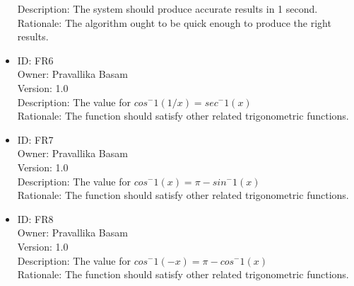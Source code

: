 \documentclass{article}
\begin{document}
\begin{itemize}
        Description: The system should produce accurate results in 1 second.\\
        Rationale: The algorithm ought to be quick enough to produce the right results.\\
        \item ID: FR6\\
        Owner: Pravallika Basam\\
        Version: 1.0\\
        Description: The value for $cos^-1(1/x)= sec^-1(x)$\\
        Rationale: The function should satisfy other related trigonometric functions.\\
        \item ID: FR7\\
        Owner: Pravallika Basam\\
        Version: 1.0\\
        Description: The value for $cos^-1(x)= \pi- sin^-1(x) $\\
        Rationale: The function should satisfy other related trigonometric functions.\\
        \item ID: FR8\\
        Owner: Pravallika Basam\\
        Version: 1.0\\
        Description: The value for $cos^-1(-x)= \pi- cos^-1(x) $\\
        Rationale: The function should satisfy other related trigonometric functions.
    \end{itemize}
\end{document}
